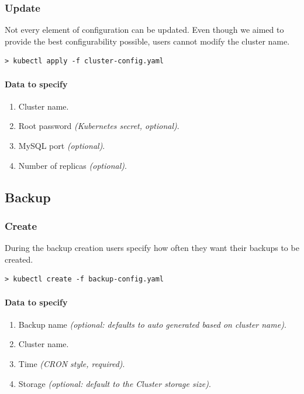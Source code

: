 \subsubsection*{Update}

Not every element of configuration can be updated. Even though we aimed 
to provide the best configurability possible, users cannot modify the
cluster name.

\begin{lstlisting}
> kubectl apply -f cluster-config.yaml
\end{lstlisting}

\paragraph{Data to specify}
\begin{enumerate}
	\item Cluster name.
	\item Root password \textit{(Kubernetes secret, optional)}.
	\item MySQL port \textit{(optional)}.
	\item Number of replicas \textit{(optional)}.
\end{enumerate}

\subsection{Backup}
\subsubsection*{Create}

During the backup creation users specify how often they want their backups 
to be created.

\begin{lstlisting}
> kubectl create -f backup-config.yaml
\end{lstlisting}

\paragraph{Data to specify}
\begin{enumerate}
	\item Backup name \textit{(optional: defaults to auto generated based on cluster name)}.
	\item Cluster name.
	\item Time \textit{(CRON style, required)}.
	\item Storage \textit{(optional: default to the Cluster storage size)}.
\end{enumerate}

